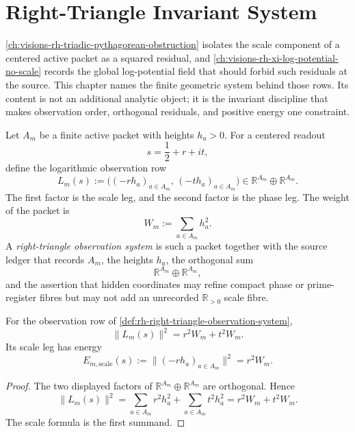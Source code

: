 \chapter{Right-Triangle Invariant System}
\label{ch:visions-rh-right-triangle-invariant-system}

\autoref{ch:visions-rh-triadic-pythagorean-obstruction} isolates the
scale component of a centered active packet as a squared residual, and
\autoref{ch:visions-rh-xi-log-potential-no-scale} records the global
log-potential field that should forbid such residuals at the source.
This chapter names the finite geometric system behind those rows.  Its
content is not an additional analytic object; it is the invariant
discipline that makes observation order, orthogonal residuals, and
positive energy one constraint.

\begin{definition}
\label{def:rh-right-triangle-observation-system}
Let $A_m$ be a finite active packet with heights $h_a>0$.  For a
centered readout
$$
s=\frac12+r+it,
$$
define the logarithmic observation row
$$
L_m(s):=\bigl((-r h_a)_{a\in A_m},\,(-t h_a)_{a\in A_m}\bigr)
\in \mathbb R^{A_m}\oplus\mathbb R^{A_m}.
$$
The first factor is the scale leg, and the second factor is the phase
leg.  The weight of the packet is
$$
W_m:=\sum_{a\in A_m}h_a^2.
$$
A \emph{right-triangle observation system} is such a packet together
with the source ledger that records $A_m$, the heights $h_a$, the
orthogonal sum
$$
\mathbb R^{A_m}\oplus\mathbb R^{A_m},
$$
and the assertion that hidden coordinates may refine compact phase or
prime-register fibres but may not add an unrecorded
$\mathbb R_{>0}$ scale fibre.
\end{definition}

\begin{theorem}
\label{thm:rh-right-triangle-energy-identity}
For the observation row of
\autoref{def:rh-right-triangle-observation-system},
$$
\|L_m(s)\|^2
=
r^2W_m+t^2W_m.
$$
Its scale leg has energy
$$
E_{m,\mathrm{scale}}(s)
:=
\|(-r h_a)_{a\in A_m}\|^2
=
r^2W_m.
$$
\end{theorem}

\begin{proof}
The two displayed factors of
$\mathbb R^{A_m}\oplus\mathbb R^{A_m}$ are orthogonal.  Hence
$$
\|L_m(s)\|^2
=
\sum_{a\in A_m}r^2h_a^2+
\sum_{a\in A_m}t^2h_a^2
=
r^2W_m+t^2W_m.
$$
The scale formula is the first summand.
\end{proof}

